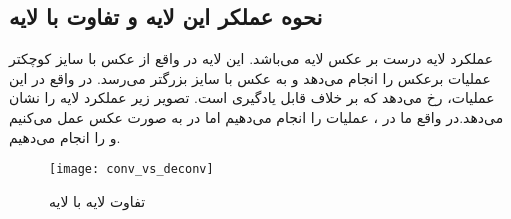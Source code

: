 \documentclass{article}
\begin{document}
\subsection{نحوه عملکر این لایه و تفاوت با لایه }
عملکرد لایه  درست بر عکس لایه  می‌باشد. این لایه در واقع از عکس با سایز کوچکتر عملیات  برعکس را انجام می‌دهد و به عکس با سایز بزرگتر می‌رسد. در واقع در این عملیات،‌ رخ می‌دهد که بر خلاف  قابل یادگیری است. تصویر زیر عملکرد لایه  را نشان می‌دهد.در واقع ما در ،‌ عملیات  را انجام می‌دهیم اما در  به صورت عکس عمل می‌کنیم و  را انجام می‌دهیم.

\begin{figure}[H]
	\centerline{\texttt{[image: conv\_vs\_deconv]}}
	\caption{تفاوت لایه  با لایه }
\end{figure}
\end{document}
